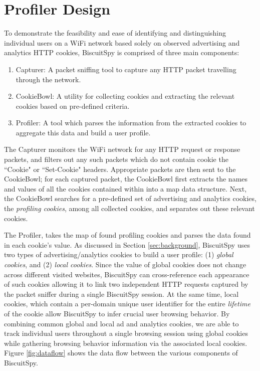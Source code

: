 \section{Profiler Design}
\label{sec:design}

To demonstrate the feasibility and ease of identifying and distinguishing individual users on a WiFi network based solely on observed advertising and analytics HTTP cookies, BiscuitSpy is comprised of three main components: 
\begin{enumerate}
\item Capturer: A packet sniffing tool to capture any HTTP packet travelling through the network.
\item CookieBowl: A utility for collecting cookies and extracting the relevant cookies based on pre-defined criteria.
\item Profiler: A tool which parses the information from the extracted cookies to aggregate this data and build a user profile.
\end{enumerate}

The Capturer monitors the WiFi network for any HTTP request or response packets, and filters out any such packets which do not contain cookie the ``Cookie" or ``Set-Cookie" headers. 
Appropriate packets are then sent to the CookieBowl; for each captured packet, the CookieBowl first extracts the names and values of all the cookies contained within into a map data structure.
Next, the CookieBowl searches for a pre-defined set of advertising and analytics cookies, the \emph{profiling cookies}, among all collected cookies, and separates out these relevant cookies.

The Profiler, takes the map of found profiling cookies and parses the data found in each cookie's value. 
As discussed in Section \ref{sec:background}, BiscuitSpy uses two types of advertising/analytics cookies to build a user profile: (1) \emph{global cookies}, and (2) \emph{local cookies}.
Since the value of global cookies does not change across different visited websites, BiscuitSpy can cross-reference each appearance of such cookies allowing it to link two independent HTTP requests captured by the packet sniffer during a single BiscuitSpy session. 
At the same time, local cookies, which contain a per-domain unique user identifier for the entire \emph{lifetime} of the cookie allow BiscuitSpy to infer crucial user browsing behavior.
By combining common global and local ad and analytics cookies, we are able to track individual users throughout a single browsing session using global cookies while gathering browsing behavior information via the associated local cookies.
Figure \ref{fig:dataflow} shows the data flow between the various components of BiscuitSpy.


